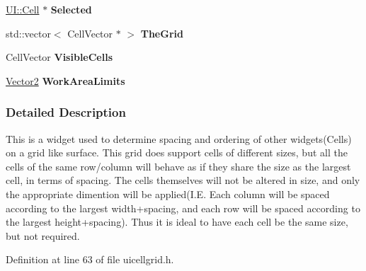 \begin{DoxyCompactItemize}
\item 
\hypertarget{classMezzanine_1_1UI_1_1CellGrid_a143c718a254713b1fd2ee42d5396d3cf}{
\hyperlink{classMezzanine_1_1UI_1_1Cell}{UI::Cell} $\ast$ {\bfseries Selected}}
\label{classMezzanine_1_1UI_1_1CellGrid_a143c718a254713b1fd2ee42d5396d3cf}

\item 
\hypertarget{classMezzanine_1_1UI_1_1CellGrid_aeac02021fe4dab087f7f4ee793b67efa}{
std::vector$<$ CellVector $\ast$ $>$ {\bfseries TheGrid}}
\label{classMezzanine_1_1UI_1_1CellGrid_aeac02021fe4dab087f7f4ee793b67efa}

\item 
\hypertarget{classMezzanine_1_1UI_1_1CellGrid_a6047973c97d0d9c9be3aa0d7acb6d4f9}{
CellVector {\bfseries VisibleCells}}
\label{classMezzanine_1_1UI_1_1CellGrid_a6047973c97d0d9c9be3aa0d7acb6d4f9}

\item 
\hypertarget{classMezzanine_1_1UI_1_1CellGrid_a11892c8fb854bcc546484c82bde88633}{
\hyperlink{classMezzanine_1_1Vector2}{Vector2} {\bfseries WorkAreaLimits}}
\label{classMezzanine_1_1UI_1_1CellGrid_a11892c8fb854bcc546484c82bde88633}

\end{DoxyCompactItemize}


\subsubsection{Detailed Description}
This is a widget used to determine spacing and ordering of other widgets(Cells) on a grid like surface. This grid does support cells of different sizes, but all the cells of the same row/column will behave as if they share the size as the largest cell, in terms of spacing. The cells themselves will not be altered in size, and only the appropriate dimention will be applied(I.E. Each column will be spaced according to the largest width+spacing, and each row will be spaced according to the largest height+spacing). Thus it is ideal to have each cell be the same size, but not required. 

Definition at line 63 of file uicellgrid.h.



